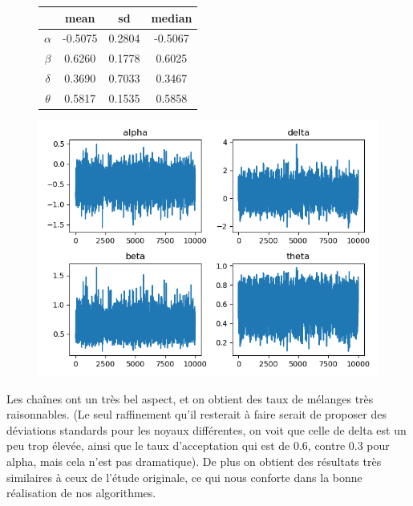 \begin{figure}[H]
\begin{minipage}{0.4\linewidth}
    \begin{center}
    \begin{tabular}{c | c  c  c}
    & mean & sd & median \\
    \hline
    $\alpha$ & -0.5075 & 0.2804 & -0.5067 \\
    $\beta$ & 0.6260  &  0.1778 & 0.6025 \\
    $\delta$ & 0.3690  &  0.7033  &  0.3467 \\
    $\theta$ & 0.5817  &  0.1535  &  0.5858 \\
    \end{tabular}
    \end{center}
\end{minipage}
\hfill
\begin{minipage}{0.5\linewidth}
    \includegraphics[width=1\linewidth]{figure/model1.png}
\end{minipage}
\end{figure}

Les chaînes ont un très bel aspect, et on obtient des taux de mélanges très raisonnables. (Le seul raffinement qu'il resterait à faire serait de proposer des déviations standards pour les noyaux différentes, on voit que celle de delta est un peu trop élevée, ainsi que le taux d'acceptation qui est de 0.6, contre 0.3 pour alpha, mais cela n'est pas dramatique). De plus on obtient des résultats très similaires à ceux de l'étude originale, ce qui nous conforte dans la bonne réalisation de nos algorithmes.


